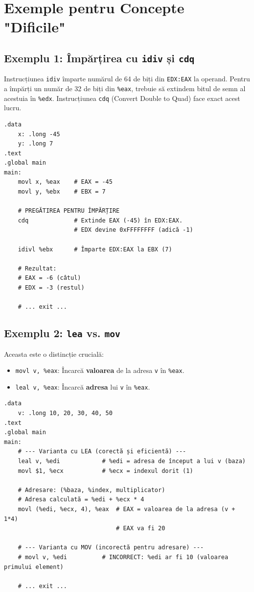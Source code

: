 \documentclass[12pt]{article}
\begin{document}
\section{Exemple pentru Concepte "Dificile"}

\subsection{Exemplu 1: Împărțirea cu \texttt{idiv} și \texttt{cdq}}
Instrucțiunea \texttt{idiv} împarte numărul de 64 de biți din \texttt{EDX:EAX} la operand. Pentru a împărți un număr de 32 de biți din \texttt{\%eax}, trebuie să extindem bitul de semn al acestuia în \texttt{\%edx}. Instrucțiunea \texttt{cdq} (Convert Double to Quad) face exact acest lucru.

\begin{lstlisting}[language=x86asm, caption={Exemplu de împărțire cu \texttt{idiv} și \texttt{cdq}}]
.data
    x: .long -45
    y: .long 7
.text
.global main
main:
    movl x, %eax    # EAX = -45
    movl y, %ebx    # EBX = 7
    
    # PREGĂTIREA PENTRU ÎMPĂRȚIRE
    cdq             # Extinde EAX (-45) în EDX:EAX. 
                    # EDX devine 0xFFFFFFFF (adică -1)
    
    idivl %ebx      # Împarte EDX:EAX la EBX (7)
    
    # Rezultat:
    # EAX = -6 (câtul)
    # EDX = -3 (restul)
    
    # ... exit ...
\end{lstlisting}

\subsection{Exemplu 2: \texttt{lea} vs. \texttt{mov}}
Aceasta este o distincție crucială:
\begin{itemize}
    \item \texttt{movl v, \%eax}: Încarcă \textbf{valoarea} de la adresa \texttt{v} în \texttt{\%eax}.
    \item \texttt{leal v, \%eax}: Încarcă \textbf{adresa} lui \texttt{v} în \texttt{\%eax}.
\end{itemize}

\begin{lstlisting}[language=x86asm, caption={Accesarea unui tablou folosind \texttt{lea}}]
.data
    v: .long 10, 20, 30, 40, 50
.text
.global main
main:
    # --- Varianta cu LEA (corectă și eficientă) ---
    leal v, %edi            # %edi = adresa de început a lui v (baza)
    movl $1, %ecx           # %ecx = indexul dorit (1)
    
    # Adresare: (%baza, %index, multiplicator)
    # Adresa calculată = %edi + %ecx * 4
    movl (%edi, %ecx, 4), %eax  # EAX = valoarea de la adresa (v + 1*4)
                                # EAX va fi 20
    
    # --- Varianta cu MOV (incorectă pentru adresare) ---
    # movl v, %edi          # INCORRECT: %edi ar fi 10 (valoarea primului element)
    
    # ... exit ...
\end{lstlisting}
\end{document}
